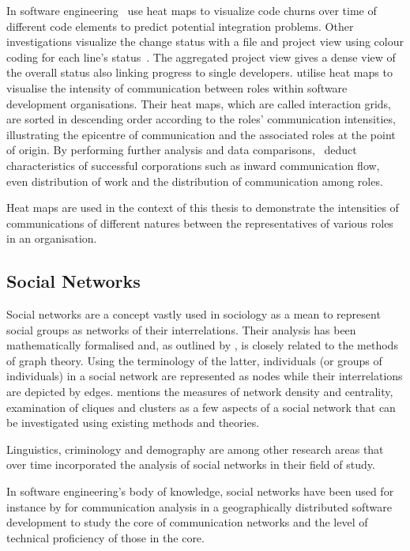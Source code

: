 In software engineering~\citet{feldt2013heatmaps} use heat maps to visualize code churns over time of different code elements to predict potential integration problems. Other investigations visualize the change status with a file and project view using colour coding for each line's status~\citep{voinea2007visualassessment}. The aggregated project view gives a dense view of the overall status also linking progress to single developers.
\citet{coplien1996patternsofprod} utilise heat maps to visualise the intensity of communication between roles within software development organisations. Their heat maps, which are called interaction grids, are sorted in descending order according to the roles' communication intensities, illustrating the epicentre of communication and the associated roles at the point of origin. By performing further analysis and data comparisons,~\citet{coplien1996patternsofprod} deduct characteristics of successful corporations such as inward communication flow, even distribution of work and the distribution of communication among roles.

Heat maps are used in the context of this thesis to demonstrate the intensities of communications of different natures between the representatives of various roles in an organisation.

\subsection{Social Networks}

Social networks are a concept vastly used in sociology as a mean to represent social groups as networks of their interrelations. Their analysis has been mathematically formalised and, as outlined by \citet{scott2011sn}, is closely related to the methods of graph theory. Using the terminology of the latter, individuals (or groups of individuals) in a social network are represented as nodes while their interrelations are depicted by edges. \citet{scott2011sn} mentions the measures of network density and centrality, examination of cliques and clusters as a few aspects of a social network that can be investigated using existing methods and theories.

Linguistics, criminology and demography are among other research areas that over time incorporated the analysis of social networks in their field of study. 

In software engineering's body of knowledge, social networks have been used for instance by \citet{Cataldo2008} for communication analysis in a geographically distributed software development to study the core of communication networks and the level of technical proficiency of those in the core. 

